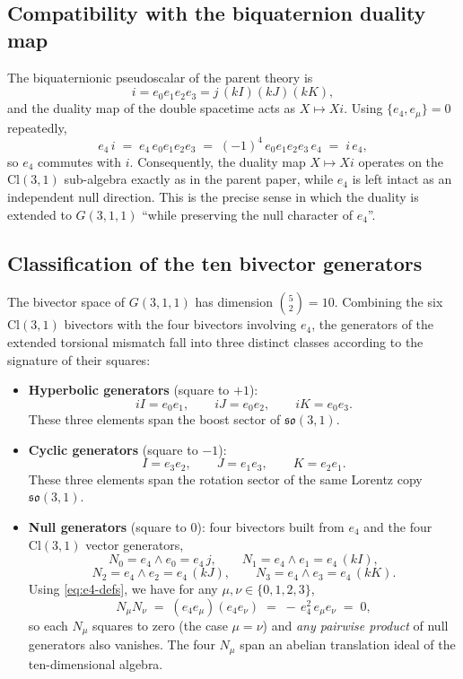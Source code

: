\documentclass[dvipdfmx,a4paper]{article}
\theoremstyle{definition}
\theoremstyle{plain}
\theoremstyle{remark}
\begin{document}
\subsection{Compatibility with the biquaternion duality map}

The biquaternionic pseudoscalar of the parent theory is
\[
i = e_{0}e_{1}e_{2}e_{3} = j\,(kI)(kJ)(kK),
\]
and the duality map of the double spacetime acts as \(X\mapsto Xi\). Using \(\{e_{4},e_{\mu}\}=0\) repeatedly,
\[
e_{4}\,i \;=\; e_{4}\,e_{0}e_{1}e_{2}e_{3} \;=\; (-1)^{4}\,e_{0}e_{1}e_{2}e_{3}\,e_{4} \;=\; i\,e_{4},
\]
so \(e_{4}\) commutes with \(i\). Consequently, the duality map \(X\mapsto Xi\) operates on the \(\mathrm{Cl}(3,1)\) sub-algebra exactly as in the parent paper, while \(e_{4}\) is left intact as an independent null direction. This is the precise sense in which the duality is extended to \(G(3,1,1)\) ``while preserving the null character of \(e_{4}\)''.

\subsection{Classification of the ten bivector generators}

The bivector space of \(G(3,1,1)\) has dimension \(\binom{5}{2}=10\). Combining the six \(\mathrm{Cl}(3,1)\) bivectors with the four bivectors involving \(e_{4}\), the generators of the extended torsional mismatch fall into three distinct classes according to the signature of their squares:

\begin{itemize}
  \item \textbf{Hyperbolic generators} (square to \(+1\)):
  \[
  iI = e_{0}e_{1},\qquad iJ = e_{0}e_{2},\qquad iK = e_{0}e_{3}.
  \]
  These three elements span the boost sector of \(\mathfrak{so}(3,1)\).

  \item \textbf{Cyclic generators} (square to \(-1\)):
  \[
  I = e_{3}e_{2},\qquad J = e_{1}e_{3},\qquad K = e_{2}e_{1}.
  \]
  These three elements span the rotation sector of the same Lorentz copy \(\mathfrak{so}(3,1)\).

  \item \textbf{Null generators} (square to \(0\)): four bivectors built from \(e_{4}\) and the four \(\mathrm{Cl}(3,1)\) vector generators,
  \[
  N_{0} = e_{4}\wedge e_{0} = e_{4}\,j,\qquad
  N_{1} = e_{4}\wedge e_{1} = e_{4}\,(kI),
  \]
  \[
  N_{2} = e_{4}\wedge e_{2} = e_{4}\,(kJ),\qquad
  N_{3} = e_{4}\wedge e_{3} = e_{4}\,(kK).
  \]
  Using \eqref{eq:e4-defs}, we have for any \(\mu,\nu\in\{0,1,2,3\}\),
  \begin{equation}
  N_{\mu}N_{\nu} \;=\; (e_{4}e_{\mu})(e_{4}e_{\nu}) \;=\; -\,e_{4}^{2}\,e_{\mu}e_{\nu} \;=\; 0,
  \label{eq:null-strong-vanishing}
  \end{equation}
  so each \(N_{\mu}\) squares to zero (the case \(\mu=\nu\)) and \emph{any pairwise product} of null generators also vanishes. The four \(N_{\mu}\) span an abelian translation ideal of the ten-dimensional algebra.
\end{itemize}
\end{document}
